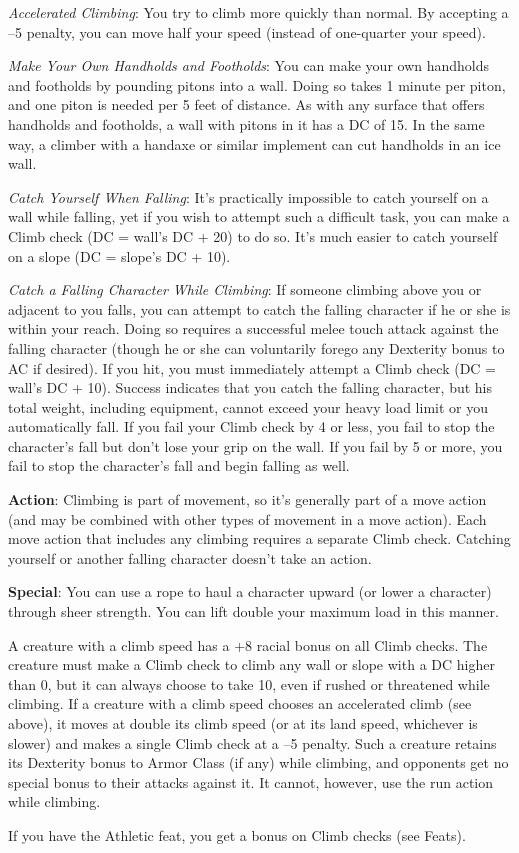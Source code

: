 \textit{Accelerated Climbing}: You try to climb more quickly than normal. By accepting a --5 penalty, you can move half your speed (instead of one-quarter your speed).
				
\textit{Make Your Own Handholds and Footholds}: You can make your own handholds and footholds by pounding pitons into a wall. Doing so takes 1 minute per piton, and one piton is needed per 5 feet of distance. As with any surface that offers handholds and footholds, a wall with pitons in it has a DC of 15. In the same way, a climber with a handaxe or similar implement can cut handholds in an ice wall.
				
\textit{Catch Yourself When Falling}: It's practically impossible to catch yourself on a wall while falling, yet if you wish to attempt such a difficult task, you can make a Climb check (DC = wall's DC + 20) to do so. It's much easier to catch yourself on a slope (DC = slope's DC + 10).
				
\textit{Catch a Falling Character While Climbing}: If someone climbing above you or adjacent to you falls, you can attempt to catch the falling character if he or she is within your reach. Doing so requires a successful melee touch attack against the falling character (though he or she can voluntarily forego any Dexterity bonus to AC if desired). If you hit, you must immediately attempt a Climb check (DC = wall's DC + 10). Success indicates that you catch the falling character, but his total weight, including equipment, cannot exceed your heavy load limit or you automatically fall. If you fail your Climb check by 4 or less, you fail to stop the character's fall but don't lose your grip on the wall. If you fail by 5 or more, you fail to stop the character's fall and begin falling as well.
				
\textbf{Action}: Climbing is part of movement, so it's generally part of a move action (and may be combined with other types of movement in a move action). Each move action that includes any climbing requires a separate Climb check. Catching yourself or another falling character doesn't take an action.
				
\textbf{Special}: You can use a rope to haul a character upward (or lower a character) through sheer strength. You can lift double your maximum load in this manner.
				
A creature with a climb speed has a +8 racial bonus on all Climb checks. The creature must make a Climb check to climb any wall or slope with a DC higher than 0, but it can always choose to take 10, even if rushed or threatened while climbing. If a creature with a climb speed chooses an accelerated climb (see above), it moves at double its climb speed (or at its land speed, whichever is slower) and makes a single Climb check at a --5 penalty. Such a creature retains its Dexterity bonus to Armor Class (if any) while climbing, and opponents get no special bonus to their attacks against it. It cannot, however, use the run action while climbing.
				
If you have the Athletic feat, you get a bonus on Climb checks (see Feats).
        	
